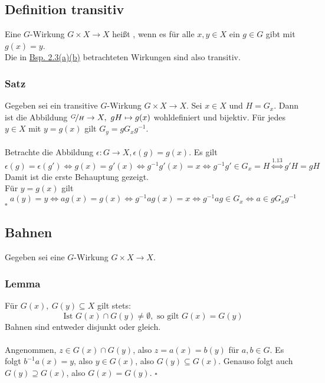 \subsection{Definition transitiv}
\label{sub:def_transitiv}
Eine $G$-Wirkung $G\times X\to X$ heißt , wenn es für alle $x,y\in X$ ein $g\in G$ gibt mit $g(x)=y$.\\
Die in \hyperref[sub:bsp_wirkungen]{Bsp. 2.3(a)(b)} betrachteten Wirkungen sind also transitiv.

\subsubsection*{Satz}
Gegeben sei ein transitive $G$-Wirkung $G\times X\to X$. Sei $x\in X$ und $H=G_x$. 
Dann ist die Abbildung $\nicefrac{G}{H}\to X,~gH\mapsto g(x)$ wohldefiniert und bijektiv. 
Für jedes $y\in X$ mit $y=g(x)$ gilt $G_y=gG_xg^{-1}$.\\

\\
Betrachte die Abbildung $\epsilon:G\to X,\epsilon(g)=g(x)$. 
Es gilt 
\[
\epsilon(g)=\epsilon(g') \Leftrightarrow g(x)=g'(x) \Leftrightarrow g^{-1}g'(x)=x \Leftrightarrow g^{-1}g'\in G_x=H \stackrel{\hyperref[sub:nebenklassen]{1.13}}{\Leftrightarrow} g'H=gH
\]
Damit ist die erste Behauptung gezeigt.\\
Für $y=g(x)$ gilt 
\[
a(y)=y \Leftrightarrow ag(x)=g(x) \Leftrightarrow g^{-1}ag(x)=x \Leftrightarrow g^{-1}ag\in G_x \Leftrightarrow a\in gG_xg^{-1}
\]
\hfill $\square$

\subsection{Bahnen}
\label{sub:bahnen}
Gegeben sei eine $G$-Wirkung $G\times X\to X$.

\subsubsection*{Lemma}
Für  $G(x),~G(y)\subseteq X$ gilt stets:
\[
\text{Ist } G(x)\cap G(y)\not=\emptyset, \text{ so gilt } G(x)=G(y)
\]
Bahnen sind entweder disjunkt oder gleich.\\

\\
Angenommen, $z\in G(x)\cap G(y)$, also $z=a(x)=b(y)$ für $a,b\in G$.
Es folgt $b^{-1}a(x)=y$, also $y\in G(x)$, also $G(y)\subseteq G(x)$.
Genauso folgt auch $G(y)\supseteq G(x)$, also $G(x)=G(y)$.
\hfill $\square$

